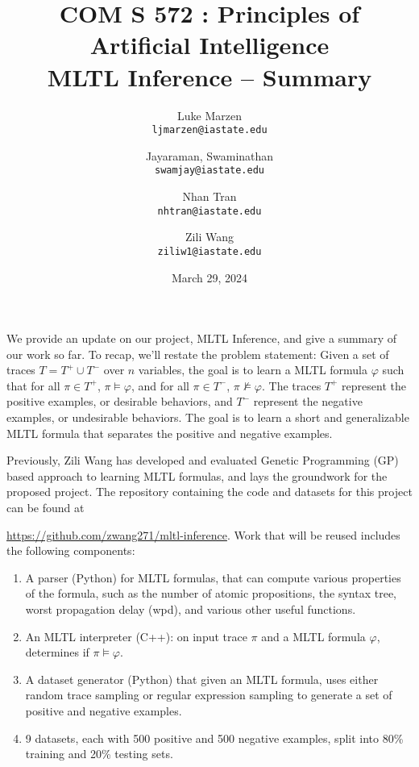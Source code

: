 \documentclass[12pt]{article}
\renewcommand{\phi}{\varphi}
\begin{document}
\title{\bf
\large COM S 572 : Principles of Artificial Intelligence \\
\large MLTL Inference -- Summary}

\author{
  Luke Marzen\\
  \texttt{ljmarzen@iastate.edu}
  \and
  Jayaraman, Swaminathan\\
  \texttt{swamjay@iastate.edu}
  \and
  Nhan Tran\\
  \texttt{nhtran@iastate.edu}
  \and
  Zili Wang\\
  \texttt{ziliw1@iastate.edu}
}

\date{March 29, 2024}

\maketitle


We provide an update on our project, MLTL Inference, and give a summary of our work so far.
To recap, we'll restate the problem statement:
Given a set of traces $T = T^+ \cup T^-$ over $n$ variables, the goal is to learn a MLTL formula $\phi$ such that for all $\pi \in T^+$, $\pi \models \phi$, and for all $\pi \in T^-$, $\pi \not\models \phi$.
The traces $T^+$ represent the positive examples, or desirable behaviors, and $T^-$ represent the negative examples, or undesirable behaviors.
The goal is to learn a short and generalizable MLTL formula that separates the positive and negative examples.

Previously, Zili Wang has developed and evaluated Genetic Programming (GP) based approach to learning MLTL formulas, and lays the groundwork for the proposed project.
The repository containing the code and datasets for this project can be found at 

\noindent \url{https://github.com/zwang271/mltl-inference}.
Work that will be reused includes the following components:
\begin{enumerate}
  \item A parser (Python) for MLTL formulas, that can compute various properties of the formula, such as the number of atomic propositions, the syntax tree, worst propagation delay (wpd), and various other useful functions.  
  \item An MLTL interpreter (C++): on input trace $\pi$ and a MLTL formula $\phi$, determines if $\pi \models \phi$.
  \item A dataset generator (Python) that given an MLTL formula, uses either random trace sampling or regular expression sampling to generate a set of positive and negative examples.
  \item 9 datasets, each with 500 positive and 500 negative examples, split into 80\% training and 20\% testing sets.
\end{enumerate}
\end{document}
